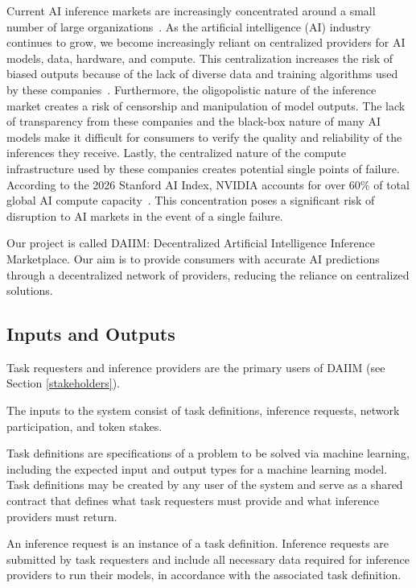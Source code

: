 \documentclass{article}
\begin{document}
Current AI inference markets are increasingly concentrated around a small number of large organizations~\cite{vipra2023market}.
As the artificial intelligence (AI) industry continues to grow, we become increasingly reliant on centralized providers for AI models, data, hardware, and compute.
This centralization increases the risk of biased outputs because of the lack of diverse data and training algorithms used by these companies~\cite{rolf2021representation}.
Furthermore, the oligopolistic nature of the inference market creates a risk of censorship and manipulation of model outputs. The lack of transparency from these companies and the black-box nature of many AI models make it difficult for consumers to verify the quality and reliability of the inferences they receive.
Lastly, the centralized nature of the compute infrastructure used by these companies creates potential single points of failure. According to the 2026 Stanford AI Index, NVIDIA accounts for over 60\% of total global AI compute capacity~\cite{aiindex2026}. 
This concentration poses a significant risk of disruption to AI markets in the event of a single failure. 
\newline

Our project is called DAIIM: Decentralized Artificial Intelligence Inference Marketplace.
Our aim is to provide consumers with accurate AI predictions through a decentralized network
of providers, reducing the reliance on centralized solutions.

\subsection{Inputs and Outputs}
\label{subsec:inputs_and_outputs}

Task requesters and inference providers are the primary users of DAIIM (see Section \ref{stakeholders}).

The inputs to the system consist of task definitions, inference requests, network participation, and token stakes.

Task definitions are specifications of a problem to be solved via machine learning, including the 
expected input and output types for a machine learning model. Task definitions may be created 
by any user of the system and serve as a shared contract that defines what task requesters must 
provide and what inference providers must return.

An inference request is an instance of a task definition. 
Inference requests are submitted by task requesters and include all necessary data required for inference providers 
to run their models, in accordance with the associated task definition.
\end{document}
